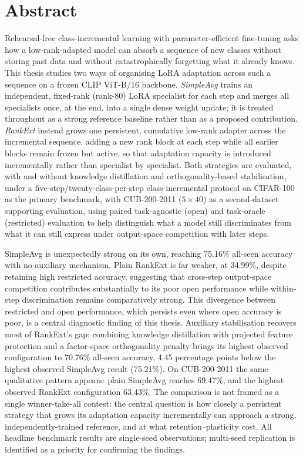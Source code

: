 \chapter*{Abstract}

Rehearsal-free class-incremental learning with parameter-efficient
fine-tuning asks how a low-rank-adapted model can absorb a sequence of new
classes without storing past data and without catastrophically forgetting
what it already knows. This thesis studies two ways of organising LoRA
adaptation across such a sequence on a frozen CLIP ViT-B/16 backbone.
\emph{SimpleAvg} trains an independent, fixed-rank (rank-80) LoRA
specialist for each step and merges all specialists once, at the end, into
a single dense weight update; it is treated throughout as a strong
reference baseline rather than as a proposed contribution. \emph{RankExt}
instead grows one persistent, cumulative low-rank adapter across the
incremental sequence, adding a new rank block at each step while all earlier blocks
remain frozen but active, so that adaptation capacity is introduced
incrementally rather than specialist by specialist. Both strategies are
evaluated, with and without knowledge distillation and orthogonality-based
stabilisation, under a five-step/twenty-class-per-step class-incremental
protocol on CIFAR-100 as the primary benchmark, with CUB-200-2011
($5\times40$) as a second-dataset supporting evaluation, using paired
task-agnostic (open)
and task-oracle (restricted) evaluation to help distinguish what a model
still discriminates from what it can still express under output-space
competition with later steps.

SimpleAvg is unexpectedly strong on its own, reaching 75.16\% all-seen
accuracy with no auxiliary mechanism. Plain RankExt is far weaker, at
34.99\%, despite retaining high restricted accuracy, suggesting that
cross-step output-space competition contributes substantially to its poor
open performance while within-step discrimination remains comparatively
strong. This divergence between
restricted and open performance, which persists even where open accuracy
is poor, is a central diagnostic finding of this thesis. Auxiliary
stabilisation recovers most of RankExt's gap: combining knowledge
distillation with projected feature protection and a factor-space
orthogonality penalty brings its highest observed configuration to
70.76\% all-seen accuracy, 4.45 percentage points below the highest observed
SimpleAvg result (75.21\%). On CUB-200-2011 the same qualitative pattern
appears: plain SimpleAvg reaches 69.47\%, and the highest observed RankExt
configuration 63.43\%. The
comparison is not framed as a single winner-take-all contest: the central
question is how closely a persistent strategy that grows its adaptation
capacity incrementally can approach a strong, independently-trained
reference, and at what retention--plasticity cost. All headline benchmark
results are single-seed observations; multi-seed replication is identified
as a priority for confirming the findings.
